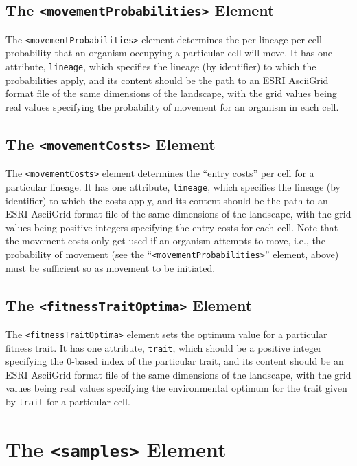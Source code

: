 \documentclass[11pt]{article}
\newcommand{\xmlelem}[1]{{\tt<\textcolor{xmlelem}{#1}>}}
\newcommand{\xmlattr}[1]{{\tt\textcolor{xmlattr}{#1}}}
\begin{document}
\subsection{The \xmlelem{movementProbabilities} Element}

The \xmlelem{movementProbabilities} element determines the per-lineage per-cell probability that an organism occupying a particular cell will move. It has one attribute, \xmlattr{lineage}, which specifies the lineage (by identifier) to which the probabilities apply, and its content should be the path to an ESRI AsciiGrid format file of the same dimensions of the landscape, with the grid values being real values specifying the probability of movement for an organism in each cell.

\subsection{The \xmlelem{movementCosts} Element}

The \xmlelem{movementCosts} element determines the ``entry costs'' per cell for a particular lineage. It has one attribute, \xmlattr{lineage}, which specifies the lineage (by identifier) to which the costs apply, and its content should be the path to an ESRI AsciiGrid format file of the same dimensions of the landscape, with the grid values being positive integers specifying the entry costs for each cell. Note that the movement costs only get used if an organism attempts to move, i.e., the probability of movement (see the ``\xmlelem{movementProbabilities}'' element, above) must be sufficient so as movement to be initiated.


\subsection{The \xmlelem{fitnessTraitOptima} Element}

The \xmlelem{fitnessTraitOptima} element sets the optimum value for a particular fitness trait. It has one attribute, \xmlattr{trait}, which should be a positive integer specifying the 0-based index of the particular trait, and its content should be an ESRI AsciiGrid format file of the same dimensions of the landscape, with the grid values being real values specifying the environmental optimum for the trait given by \xmlattr{trait} for a particular cell.

\section{The \xmlelem{samples} Element}
\end{document}
